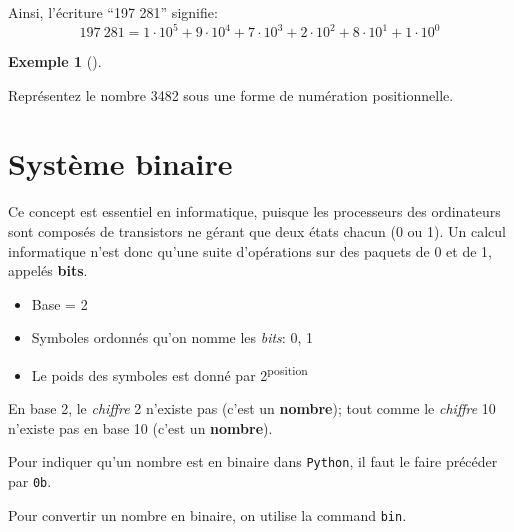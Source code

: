 \documentclass[
  letterpaper,
]{scrbook}
\providecommand{\tightlist}{%
  \setlength{\itemsep}{0pt}\setlength{\parskip}{0pt}}\usepackage{longtable,booktabs,array}
\theoremstyle{plain}
\theoremstyle{definition}
\theoremstyle{definition}
\newtheorem{example}{Exemple}[chapter]
\theoremstyle{remark}
\begin{document}
Ainsi, l'écriture ``197 281'' signifie: \[
197\ 281 = 1\cdot 10^5 + 9\cdot 10^4 + 7\cdot 10^3 + 2\cdot 10^2 + 8\cdot 10^1 +1 \cdot 10^0
\]

\begin{example}[]\protect\hypertarget{exm-decimal-3482}{}\label{exm-decimal-3482}

Représentez le nombre 3482 sous une forme de numération positionnelle.

\end{example}

\hypertarget{systuxe8me-binaire}{%
\section{Système binaire}\label{systuxe8me-binaire}}

Ce concept est essentiel en informatique, puisque les processeurs des
ordinateurs sont composés de transistors ne gérant que deux états chacun
(0 ou 1). Un calcul informatique n'est donc qu'une suite d'opérations
sur des paquets de 0 et de 1, appelés \textbf{bits}.

\begin{itemize}
\tightlist
\item
  Base = 2
\item
  Symboles ordonnés qu'on nomme les \emph{bits}: 0, 1
\item
  Le poids des symboles est donné par 2\textsuperscript{position}
\end{itemize}

\begin{tcolorbox}[enhanced jigsaw, colbacktitle=quarto-callout-important-color!10!white, toptitle=1mm, left=2mm, toprule=.15mm, opacityback=0, bottomrule=.15mm, breakable, coltitle=black, title=\textcolor{quarto-callout-important-color}{\faExclamation}\hspace{0.5em}{Important}, colframe=quarto-callout-important-color-frame, arc=.35mm, titlerule=0mm, rightrule=.15mm, opacitybacktitle=0.6, leftrule=.75mm, bottomtitle=1mm, colback=white]

En base 2, le \emph{chiffre} 2 n'existe pas (c'est un \textbf{nombre});
tout comme le \emph{chiffre} 10 n'existe pas en base 10 (c'est un
\textbf{nombre}).

\end{tcolorbox}

\begin{tcolorbox}[enhanced jigsaw, colbacktitle=quarto-callout-tip-color!10!white, toptitle=1mm, left=2mm, toprule=.15mm, opacityback=0, bottomrule=.15mm, breakable, coltitle=black, title=\textcolor{quarto-callout-tip-color}{\faLightbulb}\hspace{0.5em}{Nombres binaires en \texttt{Python}}, colframe=quarto-callout-tip-color-frame, arc=.35mm, titlerule=0mm, rightrule=.15mm, opacitybacktitle=0.6, leftrule=.75mm, bottomtitle=1mm, colback=white]

Pour indiquer qu'un nombre est en binaire dans \texttt{Python}, il faut
le faire précéder par \texttt{0b}.

Pour convertir un nombre en binaire, on utilise la command \texttt{bin}.

\end{tcolorbox}
\end{document}
